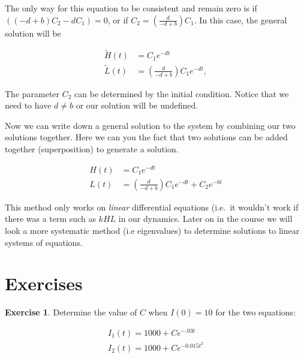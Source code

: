 \documentclass[
]{book}
\theoremstyle{definition}
\theoremstyle{definition}
\theoremstyle{definition}
\newtheorem{exercise}{Exercise}[chapter]
\theoremstyle{remark}
\begin{document}
The only way for this equation to be consistent and remain zero is if \(\left( (-d +b) C_{2} - d C_{1} \right)=0\), or if \(\displaystyle C_{2} = \left( \frac{d}{-d + b} \right) C_{1}\). In this case, the general solution will be

\begin{align}
\tilde{H}(t) &=  C_{1} e^{-d t} \\
\tilde{L}(t) &= \left( \frac{d}{-d + b} \right) C_{1} e^{-d t},
\end{align}

The parameter \(C_{2}\) can be determined by the initial condition. Notice that we need to have \(d \neq b\) or our solution will be undefined.

Now we can write down a general solution to the system by combining our two solutions together. Here we can you the fact that two solutions can be added together (superposition) to generate a solution.

\begin{align}
H(t) &=  C_{1} e^{-d t} \\
L(t) &= \left( \frac{d}{-d + b} \right) C_{1} e^{-d t} + C_{2} e^{-b t}
\end{align}

This method only works on \emph{linear} differential equations (i.e.~it wouldn't work if there was a term such as \(kHL\) in our dynamics. Later on in the course we will look a more systematic method (i.e eigenvalues) to determine solutions to linear systems of equations.

\newpage

\hypertarget{exercises-6}{%
\section{Exercises}\label{exercises-6}}

\begin{exercise}
\protect\hypertarget{exr:unnamed-chunk-118}{}{\label{exr:unnamed-chunk-118} }Determine the value of \(C\) when \(I(0)=10\) for the two equations:

\begin{equation}
\begin{split}
I_{1}(t) = 1000 + Ce^{-.03t} \\
I_{2}(t) =  1000 + C e^{-0.015 t^{2}}
\end{split}
\end{equation}
\end{exercise}

~
\end{document}
